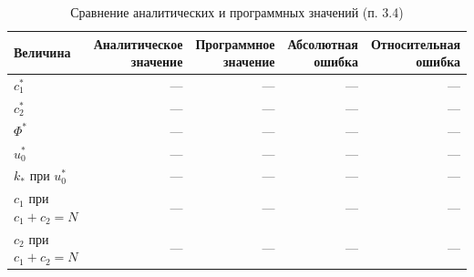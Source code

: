 \begin{table}[htbp]
\centering\footnotesize
\setlength{\tabcolsep}{4pt}
\caption{Сравнение аналитических и программных значений (п. 3.4)}
\label{tab:3-4}
\begin{tabular}{|l|r|r|r|r|}\hline
Величина & \shortstack{Аналитическое\\значение} & \shortstack{Программное\\значение} & \shortstack{Абсолютная\\ошибка} & \shortstack{Относительная\\ошибка}\\\hline
$c_1^*$ & — & — & — & —\\
$c_2^*$ & — & — & — & —\\
$\Phi^*$ & — & — & — & —\\
$u_0^*$ & — & — & — & —\\
$k_*$ при $u_0^*$ & — & — & — & —\\
$c_1$ при $c_1+c_2=N$ & — & — & — & —\\
$c_2$ при $c_1+c_2=N$ & — & — & — & —\\
\hline\end{tabular}
\end{table}

